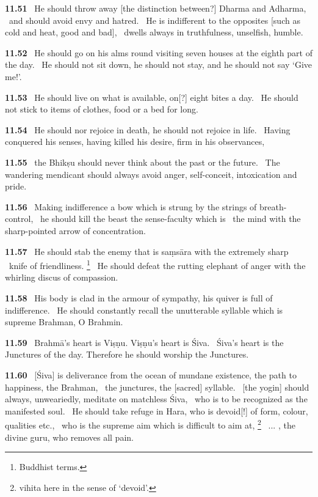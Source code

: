 \documentclass{article}
\begin{document}
\textbf{11.51}%
\ He should throw away [the distinction between?] Dharma and Adharma,%
\                      and should avoid envy and hatred.%
\ He is indifferent to the opposites [such as cold and heat, good and bad],%
\                  dwells always in truthfulness, unselfish, humble.%


\textbf{11.52}%
\ He should go on his alms round visiting seven houses at the eighth part of the day.%
\ He should not sit down, he should not stay, and he should not say `Give me!'.%


\textbf{11.53}%
\ He should live on what is available, on[?] eight bites a day.%
\ He should not stick to items of clothes, food or a bed for long.%


\textbf{11.54}%
\ He should nor rejoice in death, he should not rejoice in life.%
\ Having conquered his senses, having killed his desire, firm in his observances,%


\textbf{11.55}%
\ the Bhikṣu should never think about the past or the future.%
\ The wandering mendicant should always avoid anger, self-conceit, intoxication and pride.%


\textbf{11.56}%
\ Making indifference a bow which is strung by the strings of breath-control,%
\ he should kill the beast the sense-faculty which is%
\                         the mind with the sharp-pointed arrow of concentration.%


\textbf{11.57}%
\ He should stab the enemy that is saṃsāra with the extremely sharp%
\                  knife of friendliness.%
\footnote{Buddhist terms. }%
\ He should defeat the rutting elephant of anger with the whirling discus of compassion.%


\textbf{11.58}%
\ His body is clad in the armour of sympathy, his quiver is full of indifference.%
\ He should constantly recall the unutterable syllable which is supreme Brahman, O Brahmin.%


\textbf{11.59}%
\ Brahmā's heart is Viṣṇu. Viṣṇu's heart is Śiva.%
\ Śiva's heart is the Junctures of the day. Therefore he should worship the Junctures.%


\textbf{11.60}%
\ [Śiva] is deliverance from the ocean of mundane existence, the path to happiness, the Brahman,%
\                  the junctures, the [sacred] syllable.%
\ [the yogin] should always, unweariedly, meditate on matchless Śiva,%
\              who is to be recognized as the manifested soul.%
\ He should take refuge in Hara, who is devoid[!] of form, colour, qualities etc.,%
\              who is the supreme aim which is difficult to aim at,%
\footnote{vihita here in the sense of `devoid'. }%
\ ... , the divine guru, who removes all pain.%
\end{document}
